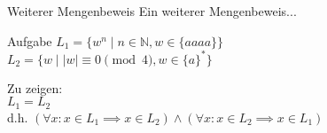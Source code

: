 %
%
%
%

\begin{frame}{Weiterer Mengenbeweis}
    Ein weiterer Mengenbeweis...
    \begin{block}{\alert{Aufgabe}}
    $L_1=\{w^{n} \mid n \in \mathbb{N}, w \in \{aaaa\}\}$\\
    $L_2=\{w \mid |w| \equiv 0 \pmod 4, w \in \{a\}^*\}$
    \end{block}
    Zu zeigen:\\
    $L_1 = L_2$\\
    d.h. $(\forall x: x \in L_1 \implies x \in L_2) \wedge (\forall x: x \in L_2 \implies x \in L_1)$

\end{frame}

